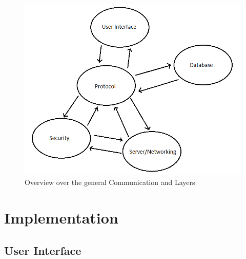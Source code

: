 \documentclass{report}
\begin{document}
\begin{figure}[H]
\vspace{-2mm} %
	\centering
    \includegraphics[width=\columnwidth]{Architecture.png}

    
    \caption{Overview over the general Communication and Layers}
\end{figure}



\section{Implementation}
\subsection{User Interface}
\end{document}
